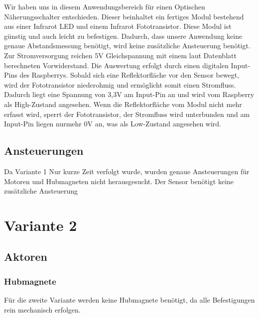 Wir haben uns in diesem Anwendungsbereich für einen Optischen Näherungsschalter entschieden. Dieser beinhaltet ein fertiges Modul bestehend aus einer Infrarot LED und einem Infrarot Fototransistor. Diese Modul ist günstig und auch leicht zu befestigen. Dadurch, dass unsere Anwendung keine genaue Abstandsmessung benötigt, wird keine zusätzliche Ansteuerung benötigt. Zur Stromversorgung reichen 5V Gleichspannung mit einem laut Datenblatt berechneten Vorwiderstand. Die Auswertung erfolgt durch einen digitalen Input-Pins des Raspberrys. Sobald sich eine Reflektorfläche vor den Sensor bewegt, wird der Fototransistor niederohmig und ermöglicht somit einen Stromfluss. Dadurch liegt eine Spannung von 3,3V am Input-Pin an und wird vom Raspberry als High-Zustand angesehen. Wenn die Reflektorfläche vom Modul nicht mehr erfasst wird, sperrt der Fototransistor, der Stromfluss wird unterbunden und am Input-Pin liegen nurmehr 0V an, was als Low-Zustand angesehen wird.

\subsection{Ansteuerungen}
Da Variante 1 Nur kurze Zeit verfolgt wurde, wurden genaue Ansteuerungen für Motoren und Hubmagneten nicht herausgesucht. Der Sensor benötigt keine zusätzliche Ansteuerung

\section{Variante 2}
\subsection{Aktoren}
\subsubsection{Hubmagnete}
Für die zweite Variante werden keine Hubmagnete benötigt, da alle Befestigungen rein mechanisch erfolgen.


